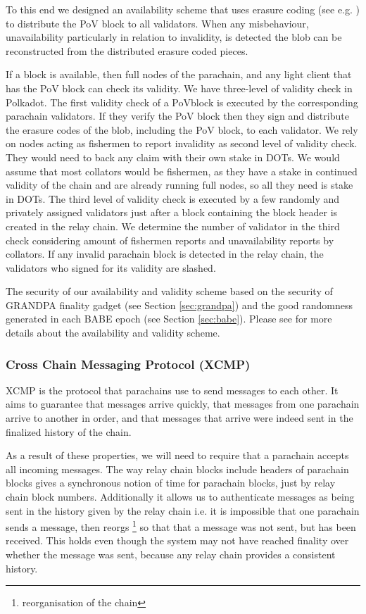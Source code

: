 To this end we designed an availability scheme that uses erasure coding (see e.g. \cite{availabilityETH2}) to distribute the PoV block to all validators.
When any misbehaviour, unavailability particularly in relation to invalidity, is detected the blob can be reconstructed from the distributed erasure coded pieces.

If a block is available, then full nodes of the parachain, and any light client that has the PoV block can check its validity. We have three-level of validity check in Polkadot. The first validity check of a PoVblock is executed by the corresponding parachain validators. If they verify the PoV block then they sign and distribute the erasure codes of the blob, including the PoV block, to each validator.
We rely on nodes acting as fishermen to report invalidity as second level of validity check. They would need to back any claim with their own stake in DOTs. We would assume that most collators would be fishermen, as they have a stake in continued validity of the chain and are already running full nodes, so all they need is stake in DOTs. The third level of validity check is executed by a few randomly and privately assigned validators just after a block containing the block header is created in the relay chain. We determine the number of validator in the third check considering amount of fishermen reports and unavailability reports by collators. If  any invalid parachain block is detected in the relay chain, the validators who signed for its validity are slashed.

The security of our availability and validity scheme based on the security of GRANDPA finality gadget (see Section \ref{sec:grandpa}) and the good randomness generated in each BABE epoch (see Section \ref{sec:babe}). Please see \cite{availandvalid} for more details about the availability and validity scheme.


\subsubsection{Cross Chain Messaging Protocol (XCMP)} \label{sec:XCMP}
XCMP is the protocol that parachains use to send messages to each other. It aims to guarantee that messages arrive quickly, that messages from one parachain arrive to another in order,
and that messages that arrive were indeed sent in the finalized history of the chain.

As a result of these properties, we will need to require that a parachain accepts all incoming messages.
The way relay chain blocks include headers of parachain blocks gives a synchronous notion of time for parachain blocks,
just by relay chain block numbers. Additionally it allows us to authenticate messages as being sent in the history given by the relay chain
i.e. it is impossible that one parachain sends a message, then reorgs \footnote{reorganisation of the chain} so that that a message was not sent, but has been received. This holds even though the system may not have reached finality over whether the message was sent, because any relay chain provides a consistent history.

